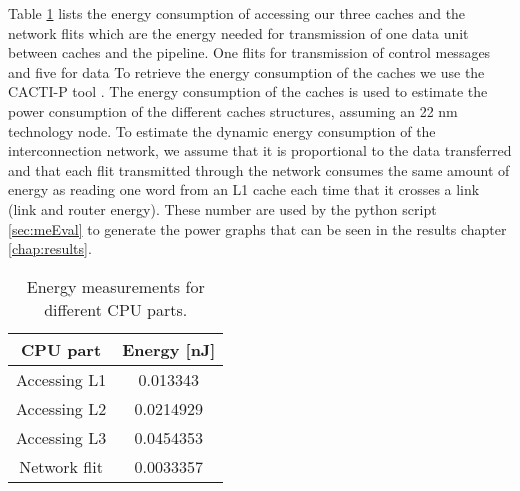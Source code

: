 Table \ref{tab:energy} lists the energy consumption of accessing our three caches and the network
flits which are the energy needed for transmission of one data unit between caches and
the pipeline. One flits for transmission of control messages and five for data \cite{thePaper}
To retrieve the energy consumption of the caches we use the CACTI-P tool \cite{energy2} . The energy consumption of the caches is used to
estimate the power consumption of the different caches structures, assuming an 22 nm
technology node. To estimate the dynamic energy consumption of the interconnection
network, we assume that it is proportional to the data transferred \cite{energy} and that each
flit transmitted through the network consumes the same amount of energy as reading
one word from an L1 cache each time that it crosses a link (link and router energy).
These number are used by the python script \ref{sec:meEval} to generate the power graphs that can be seen in the results chapter \ref{chap:results}.
\begin{table}[h]
    \begin{centering}
        \begin{tabular}{ |c|c| }
            \hline
            CPU part & Energy [nJ] \\ \hline
            Accessing L1 & 0.013343 \\ \hline
            Accessing L2 & 0.0214929 \\ \hline
            Accessing L3 & 0.0454353 \\ \hline
            Network flit & 0.0033357 \\ \hline
        \end{tabular}
        \caption{Energy measurements for different CPU parts.}
        \label{tab:energy}
    \end{centering}
\end{table}







